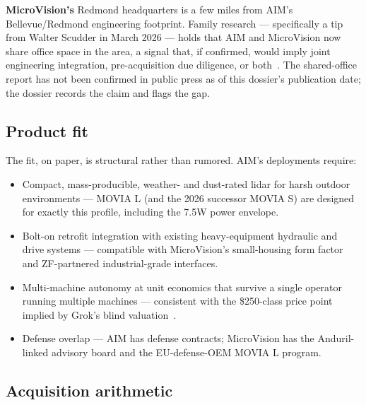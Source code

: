 \documentclass[10pt,letterpaper,twocolumn]{article}
\begin{document}
\textbf{MicroVision's} Redmond headquarters is a few miles from AIM's Bellevue/Redmond engineering footprint. Family research --- specifically a tip from Walter Scudder in March 2026 --- holds that AIM and MicroVision now share office space in the area, a signal that, if confirmed, would imply joint engineering integration, pre-acquisition due diligence, or both~\citep{scudder2026aim}. The shared-office report has not been confirmed in public press as of this dossier's publication date; the dossier records the claim and flags the gap.

\subsection{Product fit}

The fit, on paper, is structural rather than rumored. AIM's deployments require:

\begin{itemize}
  \item Compact, mass-producible, weather- and dust-rated lidar for harsh outdoor environments --- MOVIA L (and the 2026 successor MOVIA S) are designed for exactly this profile, including the 7.5W power envelope.
  \item Bolt-on retrofit integration with existing heavy-equipment hydraulic and drive systems --- compatible with MicroVision's small-housing form factor and ZF-partnered industrial-grade interfaces.
  \item Multi-machine autonomy at unit economics that survive a single operator running multiple machines --- consistent with the \$250-class price point implied by Grok's blind valuation~\citep{scudder2026grok}.
  \item Defense overlap --- AIM has defense contracts; MicroVision has the Anduril-linked advisory board and the EU-defense-OEM MOVIA L program.
\end{itemize}

\subsection{Acquisition arithmetic}
\end{document}
